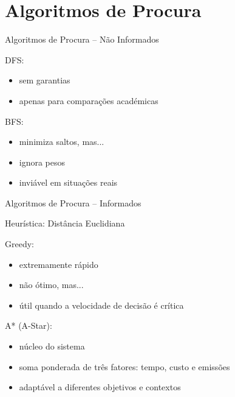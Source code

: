 \documentclass[13pt, handout]{beamer}
\begin{document}
\section{Algoritmos de Procura}

\begin{frame}{Algoritmos de Procura -- Não Informados}

        DFS:
        \begin{itemize}
            \item sem garantias
            \item apenas para comparações académicas
        \end{itemize}

        \vspace{0.5cm}
        
        BFS:
        \begin{itemize}
            \item minimiza saltos, mas...
            \item ignora pesos
            \item inviável em situações reais
        \end{itemize}
\end{frame}

\begin{frame}{Algoritmos de Procura -- Informados}

        Heurística: Distância Euclidiana
        \vspace{0.5cm}
        
        Greedy:
        \begin{itemize}
            \item extremamente rápido
            \item não ótimo, mas...
            \item útil quando a velocidade de decisão é crítica
        \end{itemize}

        \vspace{0.5cm}
        A* (A-Star):
        \begin{itemize}
            \item núcleo do sistema
            \item soma ponderada de três fatores: tempo, custo e emissões
            \item adaptável a diferentes objetivos e contextos
        \end{itemize}
\end{frame}
\end{document}
